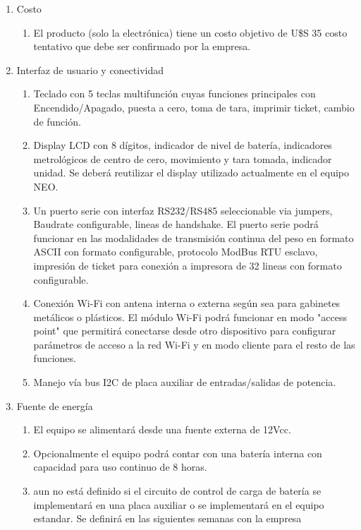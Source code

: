 \documentclass[11pt]{charter}
\begin{document}
\begin{enumerate}
\item Costo
	\begin{enumerate}
	\item El producto (solo la electrónica) tiene un costo objetivo de U\$S 35 \color{red} costo tentativo que debe ser confirmado por la empresa.
	\end{enumerate}
\item Interfaz de usuario y conectividad
	\begin{enumerate}
	\item Teclado con 5 teclas multifunción cuyas funciones principales con Encendido/Apagado, puesta a cero, toma de tara, imprimir ticket, cambio de función.
	\item Display LCD con 8 dígitos, indicador de nivel de batería, indicadores metrológicos de centro de cero, movimiento y tara tomada, indicador unidad. Se deberá reutilizar el display utilizado actualmente en el equipo NEO.
	\item Un puerto serie con interfaz RS232/RS485 seleccionable via jumpers, Baudrate configurable, lineas de handshake. El puerto serie podrá funcionar en las modalidades de transmisión continua del peso en formato ASCII con formato configurable, protocolo ModBus RTU esclavo, impresión de ticket para conexión a impresora de 32 lineas con formato configurable. 
	\item Conexión Wi-Fi con antena interna o externa según sea para gabinetes metálicos o plásticos. El módulo Wi-Fi podrá funcionar en modo "access point" que permitirá conectarse desde otro dispositivo para configurar parámetros de acceso a la red Wi-Fi y en modo cliente para el resto de las funciones.
	\item Manejo vía bus I2C de placa auxiliar de entradas/salidas de potencia.
	\end{enumerate}
\item Fuente de energía
	\begin{enumerate}
	\item El equipo se alimentará desde una fuente externa de 12Vcc.
	\item Opcionalmente el equipo podrá contar con una batería interna con capacidad para uso continuo de 8 horas.
	\item \color{red} aun no está definido si el circuito de control de carga de batería se implementará en una placa auxiliar o se implementará en el equipo estandar. Se definirá en las siguientes semanas con la empresa
	\end{enumerate}

\end{enumerate}
\end{document}
